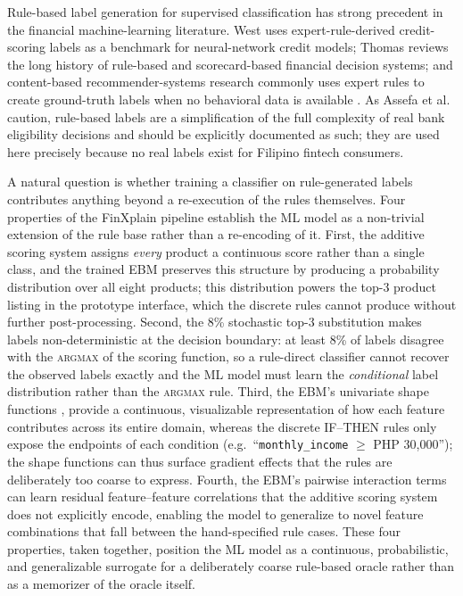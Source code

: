 \documentclass[journal]{./IEEE/IEEEtran}
\begin{document}
Rule-based label generation for supervised classification has strong precedent in the financial machine-learning literature. West \cite{ref56} uses expert-rule-derived credit-scoring labels as a benchmark for neural-network credit models; Thomas \cite{ref57} reviews the long history of rule-based and scorecard-based financial decision systems; and content-based recommender-systems research commonly uses expert rules to create ground-truth labels when no behavioral data is available \cite{ref13}. As Assefa et al. \cite{ref46} caution, rule-based labels are a simplification of the full complexity of real bank eligibility decisions and should be explicitly documented as such; they are used here precisely because no real labels exist for Filipino fintech consumers.

A natural question is whether training a classifier on rule-generated labels contributes anything beyond a re-execution of the rules themselves. Four properties of the FinXplain pipeline establish the ML model as a non-trivial extension of the rule base rather than a re-encoding of it. First, the additive scoring system assigns \emph{every} product a continuous score rather than a single class, and the trained EBM preserves this structure by producing a probability distribution over all eight products; this distribution powers the top-3 product listing in the prototype interface, which the discrete rules cannot produce without further post-processing. Second, the 8\% stochastic top-3 substitution makes labels non-deterministic at the decision boundary: at least 8\% of labels disagree with the \textsc{argmax} of the scoring function, so a rule-direct classifier cannot recover the observed labels exactly and the ML model must learn the \emph{conditional} label distribution rather than the \textsc{argmax} rule. Third, the EBM's univariate shape functions \cite{ref48}, \cite{ref49} provide a continuous, visualizable representation of how each feature contributes across its entire domain, whereas the discrete IF--THEN rules only expose the endpoints of each condition (e.g.\ ``\texttt{monthly\_income} $\geq$ PHP 30{,}000''); the shape functions can thus surface gradient effects that the rules are deliberately too coarse to express. Fourth, the EBM's pairwise interaction terms \cite{ref15} can learn residual feature--feature correlations that the additive scoring system does not explicitly encode, enabling the model to generalize to novel feature combinations that fall between the hand-specified rule cases. These four properties, taken together, position the ML model as a continuous, probabilistic, and generalizable surrogate for a deliberately coarse rule-based oracle rather than as a memorizer of the oracle itself.
\end{document}
